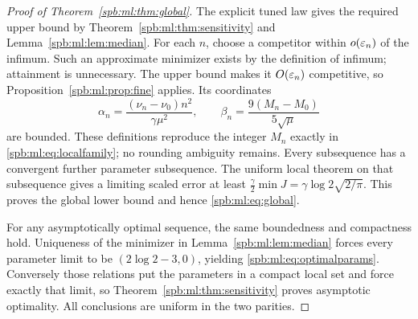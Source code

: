 \begin{proof}[Proof of Theorem~\ref{spb:ml:thm:global}]
The explicit tuned law gives the required upper bound by Theorem~\ref{spb:ml:thm:sensitivity} and Lemma~\ref{spb:ml:lem:median}. For each $n$, choose a competitor within $o(\varepsilon_n)$ of the infimum. Such an approximate minimizer exists by the definition of infimum; attainment is unnecessary. The upper bound makes it $O(\varepsilon_n)$ competitive, so Proposition~\ref{spb:ml:prop:fine} applies. Its coordinates
\[
 \alpha_n=\frac{(\nu_n-\nu_0)n^2}{\gamma\mu^2},\qquad
 \beta_n=\frac{9(M_n-M_0)}{5\sqrt\mu}
\]
are bounded. These definitions reproduce the integer $M_n$ exactly in \eqref{spb:ml:eq:localfamily}; no rounding ambiguity remains. Every subsequence has a convergent further parameter subsequence. The uniform local theorem on that subsequence gives a limiting scaled error at least $\frac\gamma2\min J=\gamma\log2\sqrt{2/\pi}$. This proves the global lower bound and hence \eqref{spb:ml:eq:global}.

For any asymptotically optimal sequence, the same boundedness and compactness hold. Uniqueness of the minimizer in Lemma~\ref{spb:ml:lem:median} forces every parameter limit to be $(2\log2-3,0)$, yielding \eqref{spb:ml:eq:optimalparams}. Conversely those relations put the parameters in a compact local set and force exactly that limit, so Theorem~\ref{spb:ml:thm:sensitivity} proves asymptotic optimality. All conclusions are uniform in the two parities.
\end{proof}
